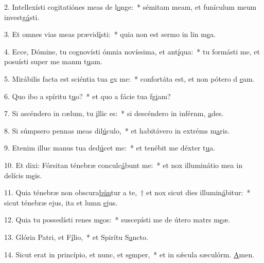 2. Intellexísti cogitatiónes meas de l\uline{o}nge:~* sémitam meam, et funículum meum investg\uline{á}sti.\par 
3. Et omnes vias meas prævid\uline{í}sti:~* quia non est sermo in lin m\uline{e}a.\par 
4. Ecce, Dómine, tu cognovísti ómnia novíssima, et ant\uline{í}qua:~* tu formásti me, et posuísti super me manm t\uline{u}am.\par 
5. Mirábilis facta est sciéntia tua \uline{e}x me:~* confortáta est, et non pótero d \uline{e}am.\par 
6. Quo ibo a spíritu t\uline{u}o?~* et quo a fácie tua fg\uline{i}am?\par 
7. Si ascéndero in cælum, tu \uline{i}llic es:~* si descéndero in inférnm, \uline{a}des.\par 
8. Si súmpsero pennas meas dil\uline{ú}culo,~* et habitávero in extréms m\uline{a}ris.\par 
9. Etenim illuc manus tua ded\uline{ú}cet me:~* et tenébit me déxter t\uline{u}a.\par 
10. Et dixi: Fórsitan ténebræ conculc\uline{á}bunt me:~* et nox illuminátio mea in delícis m\uline{e}is.\par 
11. Quia ténebræ non obscura\uline{bún}tur a te,~† et nox sicut dies illumin\uline{á}bitur:~* sicut ténebræ ejus, ita et lumn \uline{e}jus.\par 
12. Quia tu possedísti renes m\uline{e}os:~* suscepísti me de útero matrs m\uline{e}æ.\par 
13. Glória Patri, et F\uline{í}lio,~* et Spirítu S\uline{a}ncto.\par 
14. Sicut erat in princípio, et nunc, et s\uline{e}mper,~* et in sǽcula sæculórm. \uline{A}men.\par 
